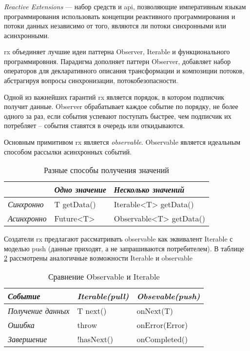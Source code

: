 \subsubsection{}
\label{sec:analysis:research:mobArch:rx}

\emph{Reactive Extensions} --- набор средств и \gls{api}, позволяющие императивным языкам программирования использовать концепции реактивного программирования и потоки данных независимо от того, являются ли потоки синхронными или асинхронными\cite{wiki:rx}.

\gls{rx} объединяет лучшие идеи паттерна Observer, Iterable и функционального программировния. Парадигма дополняет паттерн Observer, добавляет набор операторов для декларативного описания трансформации и композиции потоков, абстрагируя вопросы синхронизации, потокобезопасности.

Одной из важнейших гарантий \gls{rx} является порядок, в котором подписчик получит данные. Observer обрабатывает каждое событие по порядку, не более одного за раз, если события успевают поступать быстрее, чем подписчик их потребляет -- события ставятся в очередь или откидываются.

Основным примитивом \gls{rx} является \emph{\gls{observable}}. Observable является идеальным способом рассылки асинхронных событий.

\begin{table}[h!]
\caption{Разные способы получения значений}
\label{theory:archeticture:rx:call}
\centering
\begin{tabularx}{\textwidth}{ |X|X|X| } 
 \hline
  & \emph{Одно значение} & \emph{Несколько значений} \\ 
 \hline
 \emph{Синхронно} & T getData() & Iterable<T> getData() \\ 
 \hline
 \emph{Асинхронно} & Future<T> & Observable<T> getData() \\ 
 \hline
\end{tabularx}
\end{table}

Создатели \gls{rx} предлагают\cite{reactivex:introduction} рассматривать \gls{observable} как эквивалент Iterable с моделью push (данные приходят, а не запрашиваются потребителем). В таблице \ref{theory:archeticture:rx:iterable-observable} рассмотрены аналогичные возможности Iterable и \gls{observable}

\begin{table}[h!]
\caption{Сравнение Observable и Iterable}
\label{theory:archeticture:rx:iterable-observable}
\centering
\begin{tabularx}{\textwidth}{ |X|X|X| } 
 \hline
 \emph{Событие} & \emph{Iterable(pull)} & \emph{Obsevable(push)} \\ 
 \hline
 \emph{Получение данных} & T next() & onNext(T) \\ 
 \hline
 \emph{Ошибка} & throw & onError(Error) \\ 
 \hline
  \emph{Завершение} & !hasNext() & onCompleted() \\ 
 \hline
\end{tabularx}
\end{table}

